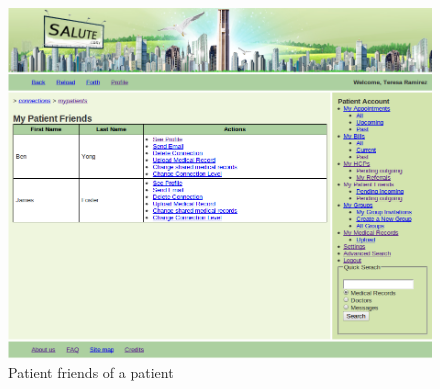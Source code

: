 \begin{figure}
\includegraphics[scale=0.5]{screenshots/my_patient_friends.png}
\caption{Patient friends of a patient}
\end{figure}